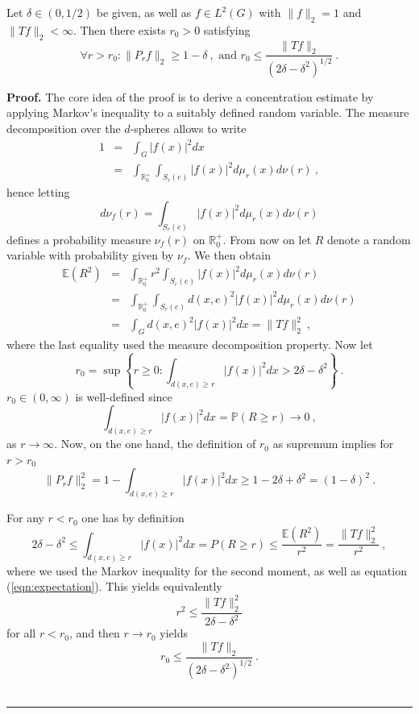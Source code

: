 \documentclass[10pt,a4paper]{amsart}
\newenvironment{proof}[1][Proof]{\noindent\textbf{#1.} }{\ \rule{0.5em}{0.5em}}
\begin{document}
\begin{proposition} \label{prop:main}
Let $\delta \in (0,1/2)$ be given, as well as $f \in L^2(G)$ with $\| f \|_2 = 1$ and $\| Tf \|_2 < \infty$. Then there exists $r_0 >0$ satisfying 
\[
\forall r > r_0: \| P_{r} f \|_2 \ge 1 - \delta~, \mbox{ and } r_0 \le \frac{\| T f \|_2}{\left(2 \delta - \delta^2 \right)^{1/2}}~.
\]
\end{proposition}

\begin{proof} The core idea of the proof is to derive a concentration estimate by applying Markov's inequality to a suitably defined random variable. The measure decomposition over the $d$-spheres allows to write
\begin{eqnarray*}
 1 & = & \int_G |f(x)|^2 dx \\
  & = & \int_{\mathbb{R}_0^+} \int_{S_r(e)} |f(x)|^2 d\mu_r(x) d\nu(r)~,
\end{eqnarray*}
hence letting  
\[
d\nu_f(r) = \int_{S_r(e)} |f(x)|^2 d\mu_r(x) d\nu(r)
\] defines a probability measure $\nu_f(r)$ on $\mathbb{R}_0^+$. From now on let $R$ denote a random variable with probability given by $\nu_f$. We then obtain
\begin{eqnarray}
 \nonumber    \mathbb{E}(R^2) & = & \int_{\mathbb{R}_0^+} r^2 \int_{S_r(e)} |f(x)|^2 d\mu_r(x) d\nu(r) \\
 \nonumber   & = & \int_{\mathbb{R}_0^+} \int_{S_r(e)} d(x,e)^2 |f(x)|^2 d\mu_r(x) d\nu(r) \\
 \label{eqn:expectation}   & = & \int_G d(x,e)^2 |f(x)|^2 dx = \| T f \|_2^2 ~,
\end{eqnarray}
where the last equality used the measure decomposition property. 
Now let 
\[
r_0 = \sup \left\{ r \ge 0: \int_{d(x,e) \ge r} |f(x)|^2 dx > 2 \delta - \delta^2 \right\}~.
\]
$r_0 \in (0,\infty)$ is well-defined since 
\[
\int_{d(x,e) \ge r} |f(x)|^2 dx = \mathbb{P} (R \ge r) \to 0 ~,
\]
 as $r \to \infty$. 
 Now, on the one hand, the definition of $r_0$ as supremum implies for $r>r_0$
 \begin{equation} \label{eqn:deliverable_1}
  \| P_{r} f \|_2^2  = 1 - \int_{d(x,e) \ge r} |f(x)|^2 dx \ge 1-2 \delta + \delta^2 = (1-\delta)^2~. 
 \end{equation}
 
 For any $r < r_0$ one has by definition 
 \[ 2 \delta - \delta^2 \le \int_{d(x,e) \ge r}|f(x)|^2 dx = P(R \ge r) \le \frac{\mathbb{E}(R^2)}{r^2} = \frac{\| T f \|_2^2}{r^2}~, \]
 where we used the Markov inequality for the second moment, as well as equation (\ref{eqn:expectation}).
This yields equivalently 
\[ r^2 \le \frac{\| Tf \|_2^2}{2 \delta - \delta^2}
\] for all $r < r_0$, and then $r \to r_0$ yields
\[
r_0 \le \frac{\| T f\|_2}{\left(2 \delta - \delta^2\right)^{1/2}}~.
\]
\end{proof}
\end{document}
